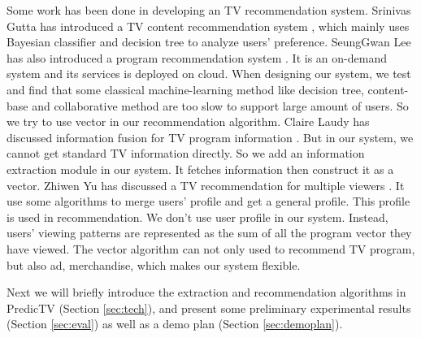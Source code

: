 Some work has been done in developing an TV recommendation
system. Srinivas Gutta has introduced a TV content recommendation
system
\cite{Gutta00:ContentRecommender}, which mainly uses
Bayesian classifier and decision tree to analyze users'
preference. SeungGwan Lee has also introduced a program
recommendation system
\cite{Lee10:RecommendunderCloud}. It is an on-demand
system and its services is deployed on cloud. When
designing our system,
we test and find that some classical machine-learning
method like decision tree, content-base and collaborative
method are too slow to support large amount of users.
So we try to use vector in our recommendation algorithm.
Claire Laudy has discussed information fusion for TV program
information
\cite{Laudy08:InfoFusion}. But in our system, we cannot get
standard TV information directly. So we add an information
extraction module in our system. It fetches information then
construct it as a vector. Zhiwen Yu has discussed a TV
recommendation for multiple viewers
\cite{Zhiwen06:RecommendMultiViewers}.
It use some algorithms to merge users' profile and get a
general profile. This profile is used in recommendation. We
don't use user profile in our system. Instead, users' viewing
patterns are represented as the
sum of all the program vector they have viewed. The vector
algorithm can not only used to recommend TV program, but
also ad, merchandise, which makes our system flexible.

Next we will briefly introduce the extraction and recommendation 
algorithms in PredicTV (Section \ref{sec:tech}), and present
some preliminary experimental results (Section \ref{sec:eval})
 as well as a demo plan (Section \ref{sec:demoplan}).
